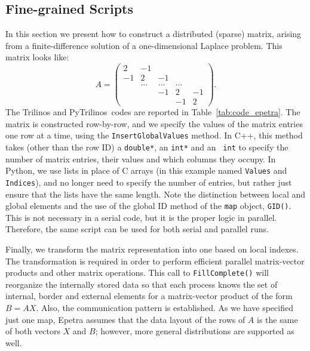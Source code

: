 \documentclass[acmtocl]{acmtrans2m}
\newcommand{\PyTrilinos}{{PyTrilinos}}
\begin{document}
\subsection{Fine-grained Scripts}
\label{sec:fine}

In this section we present how to construct a distributed (sparse)
matrix, arising from a finite-difference solution of a one-dimensional
Laplace problem.  This matrix looks like:
\begin{equation*}
  A = \begin{pmatrix}
     2 & -1     &        &        &    \\
    -1 &  2     & -1     &        &    \\
       & \ldots & \ldots & \ldots &    \\
       &        & -1     & 2      & -1 \\
       &        &        & -1     & 2
  \end{pmatrix}.
\end{equation*}
The Trilinos and \PyTrilinos\ codes are reported in
Table~\ref{tab:code_epetra}.  The matrix is constructed row-by-row,
and we specify the values of the matrix entries one row at a time,
using the {\tt InsertGlobalValues} method.  In C++, this method takes
(other than the row ID) a {\tt double*}, an {\tt int*} and an {\tt
  int} to specify the number of matrix entries, their values and which
columns they occupy.  In Python, we use lists in place of C arrays (in
this example named {\tt Values} and {\tt Indices}), and no longer need
to specify the number of entries, but rather just ensure that the
lists have the same length.  Note the distinction between local and
global elements and the use of the global ID method of the {\tt map}
object, {\tt GID()}.  This is not necessary in a serial code, but it
is the proper logic in parallel.  Therefore, the same script can be
used for both serial and parallel runs.

Finally, we transform the matrix representation into one based on
local indexes.  The transformation is required in order to perform
efficient parallel matrix-vector products and other matrix operations.
This call to {\tt FillComplete()} will reorganize the internally
stored data so that each process knows the set of internal, border and
external elements for a matrix-vector product of the form $B = AX$.
Also, the communication pattern is established.  As we have specified
just one map, Epetra assumes that the data layout of the rows of $A$ is the
same of both vectors $X$ and $B$; however, more general distributions 
are supported as well.
\end{document}

